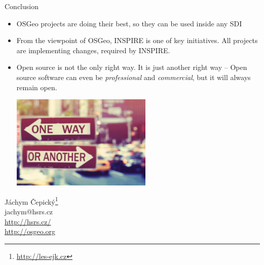 \documentclass[xcolor=dvipsnames]{beamer}
\begin{document}
\begin{frame}{Conclusion}

  \begin{itemize}
  \item
    OSGeo projects are doing their best, so they can be used inside any SDI
    \pause
  \item
    From the viewpoint of OSGeo, INSPIRE is one of key initiatives. All projects
    are implementing changes, required by INSPIRE.
    \pause
  \item 
      Open source is not the only right way. It is just another right way --
      Open source software can even be {\em professional} and {\em commercial},
      but it will always remain \alert{open}.

\begin{center} 
    \includegraphics[height=4.5cm]{imgs/ils/oneway.png}
\end{center}
  
\end{itemize}
  
\end{frame}


\begin{frame}
    \begin{center}
        Jáchym Čepický\footnote{\url{http://les-ejk.cz}} \\
        jachym@hsrs.cz \\
        \url{http://hsrs.cz/} \\
        \url{http://osgeo.org}
    \end{center}
\end{frame}
\end{document}
